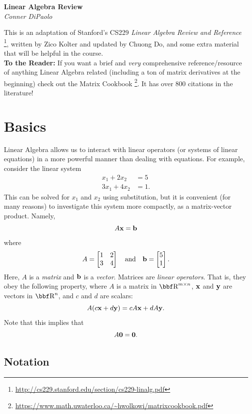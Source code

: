 \documentclass{article}
\begin{document}
\begin{center}
  \Large\textbf{Linear Algebra Review}\\
  \large\textit{Conner DiPaolo}
\end{center}
\vspace*{1em}

\tableofcontents
\vspace{1em}

This is an adaptation of Stanford's CS229 \textit{Linear Algebra Review and Reference}
\footnote{\url{http://cs229.stanford.edu/section/cs229-linalg.pdf}}, written by Zico Kolter
and updated by Chuong Do, and some extra material that will be helpful in the
course.\\

\textbf{To the Reader:} If you want a brief and \textit{very} comprehensive reference/resource
of anything Linear Algebra related (including a ton of matrix derivatives at the beginning)
check out the Matrix Cookbook \footnote{\url{https://www.math.uwaterloo.ca/~hwolkowi/matrixcookbook.pdf}}.
It has over 800 citations in the literature!

\section{Basics}

Linear Algebra allows us to interact with linear operators (or systems
of linear equations) in a more powerful manner than dealing with equations.
For example, consider the linear system
\begin{align*}
    x_1 + 2x_2 &= 5\\
    3x_1 + 4x_2 &= 1.
\end{align*}
This can be solved for $x_1$ and $x_2$ using substitution, but it is
convenient (for many reasons) to investigate this system more compactly,
as a matrix-vector product. Namely,
\[
    A{\bf x} = {\bf b}
\]
where
\[
    A = \begin{bmatrix} 1&2\\3&4 \end{bmatrix} \quad\text{and}\quad {\bf b} = \begin{bmatrix} 5\\1 \end{bmatrix}.
\]
Here, $A$ is a \textit{matrix} and ${\bf b}$ is a \textit{vector}. Matrices are
\textit{linear operators}. That is, they obey the following property, where
$A$ is a matrix in $\RR^{m\times n}$, ${\bf x}$ and ${\bf y}$ are vectors in $\RR^n$,
and $c$ and $d$ are scalars:
\[
    A(c{\bf x}+d{\bf y}) = cA{\bf x} + dA{\bf y}.
\]
Note that this implies that
\[
    A{\bf 0} = {\bf 0}.
\]

\subsection{Notation}
\end{document}
